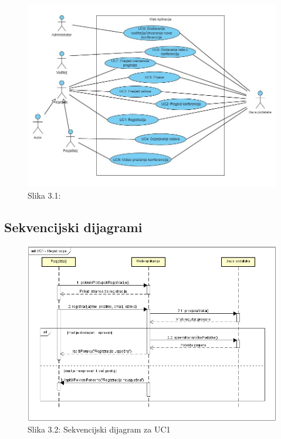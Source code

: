 		\begin{figure}[H]
			\includegraphics[scale=0.55]{slike/UML1.JPG} 
			\centering
			\caption{Slika 3.1: }
			\label{UML1}
		\end{figure}		
				
			\subsection{Sekvencijski dijagrami}
				
		\begin{figure}[H]
			\includegraphics[scale=0.7]{slike/UC1.PNG} 
			\centering
			\caption{Slika 3.2: Sekvencijski dijagram za UC1}
			\label{fig:UC1}
		\end{figure}	

